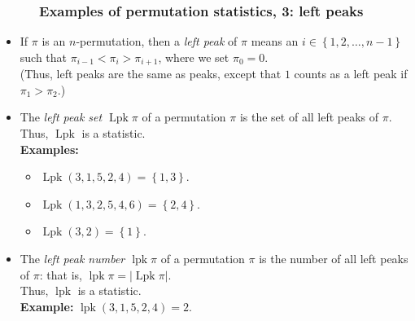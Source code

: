 \documentclass{beamer}
\newcommand{\Lpk}{\operatorname{Lpk}}
\newcommand{\lpk}{\operatorname{lpk}}
\newcommand{\fti}[1]{\frametitle{\ \ \ \ \ #1}}
\newcommand{\set}[1]{\left\{ #1 \right\}}
\newcommand{\abs}[1]{\left| #1 \right|}
\newcommand{\tup}[1]{\left( #1 \right)}
\newcommand{\defn}[1]{{\color{darkred}\emph{#1}}} %
\theoremstyle{plain}
\begin{document}
\begin{frame}
\fti{Examples of permutation statistics, 3: left peaks}

\begin{itemize}

\item If $\pi$ is an $n$-permutation, then a \defn{left peak} of $\pi$
      means an $i \in \set{1, 2, \ldots, n-1}$ such that
      $\pi_{i-1} < \pi_i > \pi_{i+1}$, where we set \defn{$\pi_0 = 0$}. \\
      (Thus, left peaks are the same as peaks, except that $1$ counts
      as a left peak if $\pi_1 > \pi_2$.)

\item The \defn{left peak set $\Lpk \pi$} of a permutation $\pi$ is
      the set of all left peaks of $\pi$. \\
      Thus, \defn{$\Lpk$} is a statistic. \\
      \textbf{Examples:}
      \begin{itemize}
      \item $\Lpk \tup{3, 1, 5, 2, 4} = \set{1, 3}$.
      \item $\Lpk \tup{1, 3, 2, 5, 4, 6} = \set{2, 4}$.
      \item $\Lpk \tup{3, 2} = \set{1}$.
      \end{itemize}

\item The \defn{left peak number $\lpk \pi$} of a permutation $\pi$
      is the number of all left peaks of $\pi$: that is,
      $\lpk \pi = \abs{\Lpk \pi}$. \\
      Thus, \defn{$\lpk$} is a statistic. \\
      \textbf{Example:} $\lpk \tup{3, 1, 5, 2, 4} = 2$.

\end{itemize}
\vspace{10cm}
\end{frame}
\end{document}

